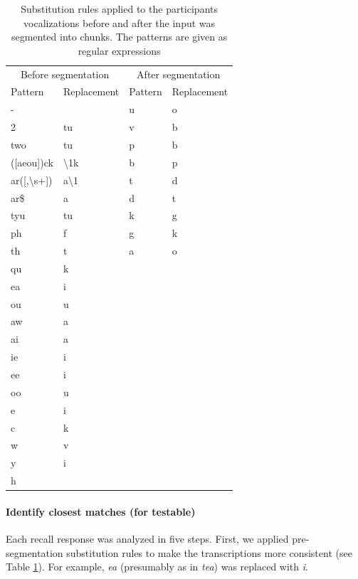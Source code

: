 \documentclass[]{article}
\let\oldparagraph\paragraph
\renewcommand{\paragraph}[1]{\oldparagraph{#1}\mbox{}}
\begin{document}
\begin{table}

\caption{\label{tab:recall-print-substitution-rules}Substitution rules applied to the participants vocalizations before and after the input was segmented into chunks. The patterns are given as regular expressions}
\centering
\begin{tabular}[t]{llll}
\toprule
\multicolumn{2}{c}{Before segmentation} & \multicolumn{2}{c}{After segmentation} \\
\cmidrule(l{3pt}r{3pt}){1-2} \cmidrule(l{3pt}r{3pt}){3-4}
Pattern & Replacement & Pattern & Replacement\\
\midrule
- &  & u & o\\
2 & tu & v & b\\
two & tu & p & b\\
([aeou])ck & \textbackslash{}1k & b & p\\
ar([,\textbackslash{}s+]) & a\textbackslash{}1 & t & d\\
\addlinespace
ar\$ & a & d & t\\
tyu & tu & k & g\\
ph & f & g & k\\
th & t & a & o\\
qu & k &  & \\
\addlinespace
ea & i &  & \\
ou & u &  & \\
aw & a &  & \\
ai & a &  & \\
ie & i &  & \\
\addlinespace
ee & i &  & \\
oo & u &  & \\
e & i &  & \\
c & k &  & \\
w & v &  & \\
\addlinespace
y & i &  & \\
h &  &  & \\
\bottomrule
\end{tabular}
\end{table}

\paragraph{Identify closest matches (for
testable)}\label{identify-closest-matches-for-testable}

Each recall response was analyzed in five steps. First, we applied
pre-segmentation substitution rules to make the transcriptions more
consistent (see Table \ref{tab:recall-print-substitution-rules}). For
example, \emph{ea} (presumably as in \emph{tea}) was replaced with
\emph{i}.
\end{document}
